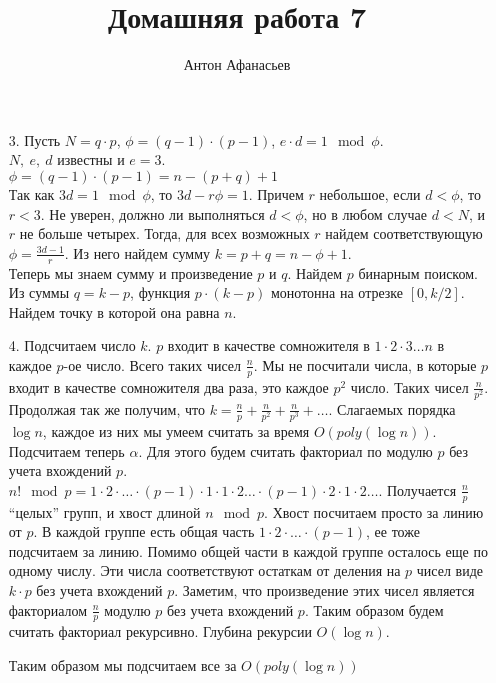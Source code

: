 \documentclass[10pt]{article}
\begin{document}
\title{Домашняя работа 7}
\author{Антон Афанасьев}
\maketitle

\begin{enumerate}
	\item[3.] Пусть $N = q \cdot p$, $\phi = (q-1) \cdot (p-1)$, $e \cdot d = 1\mod \phi$. \\
	$N,\ e,\ d$ известны и $e=3$.\\
	$\phi = (q-1) \cdot (p-1) = n - (p+q) +1$\\
	Так как $3d = 1 \mod \phi$, то $3d - r \phi = 1$. Причем $r$ небольшое, если $d < \phi$, то $r < 3$. Не уверен, должно ли выполняться $d < \phi$, но в любом случае $d < N$, и $r$ не больше четырех. Тогда, для всех возможных $r$ найдем соответствующую $\phi = \frac{3d - 1}{r}$. Из него найдем сумму $k = p + q = n - \phi + 1$.\\
	Теперь мы знаем сумму и произведение $p$ и $q$. Найдем $p$ бинарным поиском. Из суммы $q = k- p$, функция $p \cdot (k-p)$ монотонна на отрезке $[0, k/2]$. Найдем точку в которой она равна $n$.
	
	\item[4.]  Подсчитаем число $k$. $p$ входит в качестве сомножителя в $1 \cdot 2 \cdot 3 \ldots n$ в каждое $p$-ое число. Всего таких чисел $\frac{n}{p}$. Мы не посчитали числа, в которые $p$ входит в качестве сомножителя два раза, это каждое $p^2$ число. Таких чисел $\frac{n}{p^2}$. Продолжая так же получим, что $k = \frac{n}{p} + \frac{n}{p^2} + \frac{n}{p^3} + \ldots$. Слагаемых порядка $\log n$, каждое из них мы умеем считать за время $O(poly(\log n))$.
	Подсчитаем теперь $\alpha$. Для этого будем считать факториал по модулю $p$ без учета вхождений $p$. $n! \mod p = 1 \cdot 2 \cdot \ldots \cdot (p-1) \cdot 1 \cdot 1 \cdot 2 \ldots \cdot (p-1) \cdot 2 \cdot 1 \cdot 2 \ldots$. Получается $\frac{n}{p}$ ``целых'' групп, и хвост длиной $n \mod p$. Хвост посчитаем просто за линию от $p$. В каждой группе есть общая часть $1 \cdot 2 \cdot \ldots \cdot (p-1)$, ее тоже подсчитаем за линию. Помимо общей части в каждой группе осталось еще по одному числу. Эти числа соответствуют остаткам от деления на $p$ чисел виде $k \cdot p$ без учета вхождений $p$. Заметим, что произведение этих чисел является факториалом $\frac{n}{p}$ модулю $p$ без учета вхождений $p$. Таким образом будем считать факториал рекурсивно. Глубина рекурсии $O(\log n)$.
	
	Таким образом мы подсчитаем все за $O(poly(\log n))$
\end{enumerate}
\end{document}
